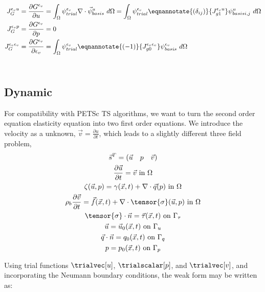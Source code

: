 \begin{align}
J_G^{\epsilon_{v}u} &= \frac{\partial G^{\epsilon_{v}}}{\partial u} =
\int_{\Omega} \psi_{trial}^{\epsilon_{v}} \nabla \cdot \vec{\psi}_{basis}^u \ d\Omega = \int_{\Omega}
\psi_{trial}^{\epsilon_{v}}
\eqnannotate{\left(\delta_{ij}\right)}{J_{g1}^{\epsilon_{v}u}}
\psi_{basis
i,j}^u \
d\Omega\\
%
J_G^{\epsilon_{v}p} &= \frac{\partial G^{\epsilon_{v}}}{\partial p} = 0 \\
J_G^{\epsilon_{v} \epsilon_{v}} &= \frac{\partial G^{\epsilon_{v}}}{\partial
\epsilon_{v}} = \int_{\Omega} \psi_{trial}^{\epsilon_{v}}
\eqnannotate{\left(-1\right)}{J_{g0}^{\epsilon_{v}\epsilon_{v}}}
\psi_{basis}^{\epsilon_{v}} \ d\Omega
\end{align} \\


\subsection{Dynamic}

For compatibility with PETSc TS algorithms, we want to turn the second
order equation elasticity equation into two first order equations. We
introduce the velocity as a unknown,
$\vec{v}=\frac{\partial u}{\partial t}$, which leads to a slightly
different three field problem,
\begin{gather}
\vec{s}^{T} = \left(\vec{u} \quad p \quad \vec{v}\right) \\
\frac{\partial \vec{u}}{\partial t} = \vec{v} \text{ in } \Omega \\
\zeta(\vec{u},p) = \gamma(\vec{x},t) + \nabla \cdot \vec{q}(p) \text{ in } \Omega \\
\rho_{b} \frac{\partial \vec{v}}{\partial t} = \vec{f}(\vec{x},t) + \nabla \cdot \tensor{\sigma}(\vec{u},p) \text{ in } \Omega \\
\tensor{\sigma} \cdot \vec{n} = \vec{\tau}(\vec{x},t) \text{ on } \Gamma_{\tau} \\
\vec{u} = \vec{u}_{0}(\vec{x}, t) \text{ on } \Gamma_{u} \\
\vec{q} \cdot \vec{n} = q_{0}(\vec{x}, t) \text{ on } \Gamma_{q} \\
p = p_{0}(\vec{x},t) \text{ on } \Gamma_{p}
\end{gather}



Using trial functions $\trialvec[u]$, $\trialscalar[p]$, and $\trialvec[v]$, and incorporating the
Neumann boundary conditions, the weak form may be written as:

